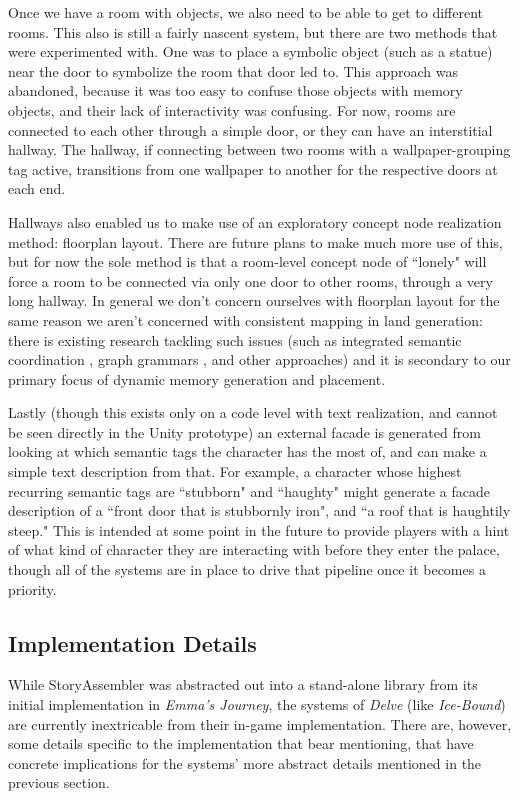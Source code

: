 Once we have a room with objects, we also need to be able to get to different rooms. This also is still a fairly nascent system, but there are two methods that were experimented with. One was to place a symbolic object (such as a statue) near the door to symbolize the room that door led to. This approach was abandoned, because it was too easy to confuse those objects with memory objects, and their lack of interactivity was confusing. For now, rooms are connected to each other through a simple door, or they can have an interstitial hallway. The hallway, if connecting between two rooms with a wallpaper-grouping tag active, transitions from one wallpaper to another for the respective doors at each end.

Hallways also enabled us to make use of an exploratory concept node realization method: floorplan layout. There are future plans to make much more use of this, but for now the sole method is that a room-level concept node of ``lonely" will force a room to be connected via only one door to other rooms, through a very long hallway. In general we don't concern ourselves with floorplan layout for the same reason we aren't concerned with consistent mapping in land generation: there is existing research tackling such issues (such as integrated semantic coordination \cite{semantic_building}, graph grammars \cite{bidarra_designing}, and other approaches) and it is secondary to our primary focus of dynamic memory generation and placement.

Lastly (though this exists only on a code level with text realization, and cannot be seen directly in the Unity prototype) an external facade is generated from looking at which semantic tags the character has the most of, and can make a simple text description from that. For example, a character whose highest recurring semantic tags are ``stubborn" and ``haughty" might generate a facade description of a ``front door that is stubbornly iron", and ``a roof that is haughtily steep." This is intended at some point in the future to provide players with a hint of what kind of character they are interacting with before they enter the palace, though all of the systems are in place to drive that pipeline once it becomes a priority.

\subsection{Implementation Details}\label{subsec:delve-implementation-details}

While StoryAssembler was abstracted out into a stand-alone library from its initial implementation in \textit{Emma's Journey}, the systems of \textit{Delve} (like \textit{Ice-Bound}) are currently inextricable from their in-game implementation. There are, however, some details specific to the implementation that bear mentioning, that have concrete implications for the systems' more abstract details mentioned in the previous section.


